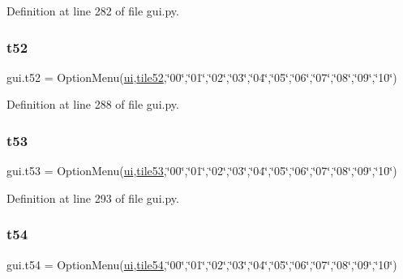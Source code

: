 Definition at line 282 of file gui.\+py.

\mbox{\label{namespacegui_aa53ad7d5dedd61f40709867b5b271755}} 
\subsubsection{\texorpdfstring{t52}{t52}}
{\footnotesize\ttfamily gui.\+t52 = Option\+Menu(\mbox{\hyperlink{namespacegui_a40ab7281456eadbea2dc2038f5c24fa1}{ui}},\mbox{\hyperlink{namespacegui_a0a21b48dd64e7d0944745635aa9d8c8b}{tile52}},\char`\"{}00\char`\"{},\char`\"{}01\char`\"{},\char`\"{}02\char`\"{},\char`\"{}03\char`\"{},\char`\"{}04\char`\"{},\char`\"{}05\char`\"{},\char`\"{}06\char`\"{},\char`\"{}07\char`\"{},\char`\"{}08\char`\"{},\char`\"{}09\char`\"{},\char`\"{}10\char`\"{})}



Definition at line 288 of file gui.\+py.

\mbox{\label{namespacegui_ae4081ef0f03c5305cf8c4d3ef3f07fcc}} 
\subsubsection{\texorpdfstring{t53}{t53}}
{\footnotesize\ttfamily gui.\+t53 = Option\+Menu(\mbox{\hyperlink{namespacegui_a40ab7281456eadbea2dc2038f5c24fa1}{ui}},\mbox{\hyperlink{namespacegui_a449b826a702e5cc4b285882012dd3d8a}{tile53}},\char`\"{}00\char`\"{},\char`\"{}01\char`\"{},\char`\"{}02\char`\"{},\char`\"{}03\char`\"{},\char`\"{}04\char`\"{},\char`\"{}05\char`\"{},\char`\"{}06\char`\"{},\char`\"{}07\char`\"{},\char`\"{}08\char`\"{},\char`\"{}09\char`\"{},\char`\"{}10\char`\"{})}



Definition at line 293 of file gui.\+py.

\mbox{\label{namespacegui_ab0d0b4de13ca619fb73889f8d1456ab9}} 
\subsubsection{\texorpdfstring{t54}{t54}}
{\footnotesize\ttfamily gui.\+t54 = Option\+Menu(\mbox{\hyperlink{namespacegui_a40ab7281456eadbea2dc2038f5c24fa1}{ui}},\mbox{\hyperlink{namespacegui_ac53f25e251f182149848acb4f70689ce}{tile54}},\char`\"{}00\char`\"{},\char`\"{}01\char`\"{},\char`\"{}02\char`\"{},\char`\"{}03\char`\"{},\char`\"{}04\char`\"{},\char`\"{}05\char`\"{},\char`\"{}06\char`\"{},\char`\"{}07\char`\"{},\char`\"{}08\char`\"{},\char`\"{}09\char`\"{},\char`\"{}10\char`\"{})}




